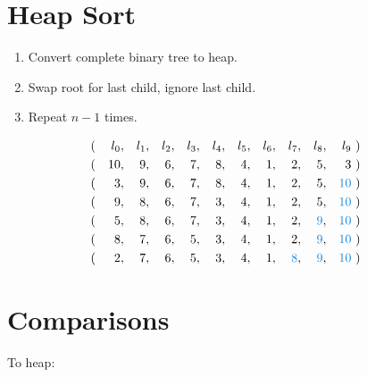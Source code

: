 \documentclass{notes}
\begin{document}
  \section*{Heap Sort}
    \begin{enumerate}
      \item Convert complete binary tree to heap.
      \item Swap root for last child, ignore last child.
      \item Repeat \(n-1\) times.
    \end{enumerate}

    \begin{align*}
      &(&l_0&,&l_1&,&l_2&,&l_3&,&l_4&,&l_5&,&l_6&,&l_7&,&l_8&,&l_9\ &)&\\
      &(&10&,&9&,&6&,&7&,&8&,&4&,&1&,&2&,&5&,&3\ &)&\\
      &(&3&,&9&,&6&,&7&,&8&,&4&,&1&,&2&,&5&,&{\color{gmitblue}10}\ &)&\\
      &(&9&,&8&,&6&,&7&,&3&,&4&,&1&,&2&,&5&,&{\color{gmitblue}10}\ &)&\\
      &(&5&,&8&,&6&,&7&,&3&,&4&,&1&,&2&,&{\color{gmitblue}9}&,&{\color{gmitblue}10}\ &)&\\
      &(&8&,&7&,&6&,&5&,&3&,&4&,&1&,&2&,&{\color{gmitblue}9}&,&{\color{gmitblue}10}\ &)&\\
      &(&2&,&7&,&6&,&5&,&3&,&4&,&1&,&{\color{gmitblue}8}&,&{\color{gmitblue}9}&,&{\color{gmitblue}10}\ &)&\\
    \end{align*}

  \section*{Comparisons}

  \begin{description}
    \item[To heap:] 
  \end{description}


\end{document}
